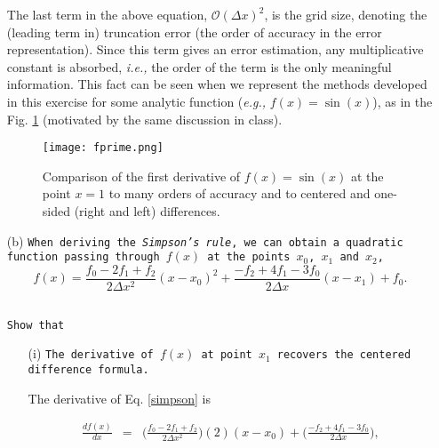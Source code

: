 \documentclass[11pt]{article}
\newcommand{\ie}{{\it i.e., }}
\newcommand{\eg}{{\it e.g., }}
\begin{document}
\begin{enumerate}
\quad

\centerline{}

\quad

The last term in the above equation, $ \mathcal{O}(\Delta x)^2$, is the grid size, denoting the  (leading term in) truncation error (the order of accuracy in the error representation). Since this term  gives an error estimation, any multiplicative constant is absorbed, \ie the order of the term is the only meaningful information. This fact can be seen when we represent the methods developed in this exercise for some analytic function (\eg $f(x)=\sin(x)$), as in the Fig. \ref{der-comp} (motivated by the same discussion in class).

\quad

\begin{figure} [ht]
\begin{center}
\texttt{[image: fprime.png]} 
\caption{Comparison of the first derivative of $f(x)=\sin(x)$ at the point $x=1$ to many orders of accuracy and to centered and one-sided (right and left) differences.}
\label{der-comp}
\end{center}
\end{figure} 

\quad

\item[(b)] {\color{MidnightBlue}\texttt{When deriving the {\it Simpson's rule}, we can obtain a quadratic function passing through $f(x)$ at the points $x_0$, $x_1$ and $x_2$,
\begin{equation}
f(x) = \frac{f_0 - 2f_1 +f_2}{2 \Delta x^2} (x-x_0)^2 + \frac{-f_2+4f_1-3f_0}{2\Delta x}(x-x_1) + f_0.
\label{simpson}
\end{equation} }}


{\color{MidnightBlue}\texttt{Show that }}

\begin{enumerate}
\item[(i)] {\color{MidnightBlue}\texttt{The derivative of $f(x)$	at point $x_1$ recovers the centered difference formula.}}

\quad

The derivative of Eq. \ref{simpson} is

\begin{eqnarray}
\frac{d f(x)}{dx} &=& \Bigg( \frac{f_0-2f_1+f_2}{2\Delta x^2} \Bigg)(2)(x-x_0) + \Bigg( \frac{-f_2+4f_1-3f_0}{2\Delta x} \Bigg),
\label{df}
\end{eqnarray}
 

\end{enumerate}
\end{enumerate}
\end{document}

